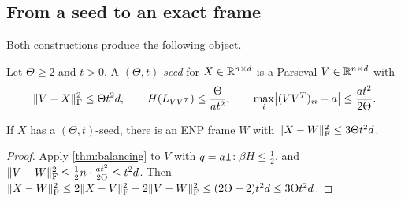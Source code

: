 \subsection{From a seed to an exact frame}

Both constructions produce the following object.

\begin{definition}[Seed]\label{def:seed}
Let $\Theta\ge2$ and $t>0$. A \emph{$(\Theta,t)$-seed} for $X\in\mathbb R^{n\times d}$
is a Parseval $V\in\mathbb R^{n\times d}$ with
\[
 \lVert V-X\rVert_{\mathrm F}^2\le\Theta t^2d,\qquad
 H(L_{VV^T})\le\frac{\Theta}{at^2},\qquad
 \max_i\bigl|(VV^T)_{ii}-a\bigr|\le\frac{at^2}{2\Theta}.
\]
\end{definition}

\begin{corollary}\label{cor:seed}
If $X$ has a $(\Theta,t)$-seed, there is an ENP frame $W$ with
$\lVert X-W\rVert_{\mathrm F}^2\le3\Theta t^2d$.
\end{corollary}

\begin{proof}
Apply \cref{thm:balancing} to $V$ with $q=a\mathbf 1$: $\beta H\le\frac12$, and
$\lVert V-W\rVert_{\mathrm F}^2\le\frac12n\cdot\frac{at^2}{2\Theta}\le t^2d$. Then
$\lVert X-W\rVert_{\mathrm F}^2\le2\lVert X-V\rVert_{\mathrm F}^2+2\lVert V-W\rVert_{\mathrm F}^2\le(2\Theta+2)t^2d\le3\Theta t^2d$.
\end{proof}
